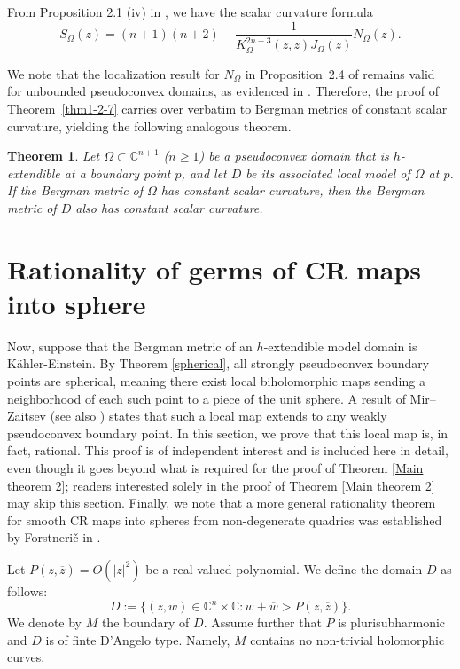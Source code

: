 \documentclass[a4paper,centertags,oneside,12pt]{amsart}
\newtheorem{theorem}{Theorem}[section]
\numberwithin{equation}{section}
\begin{document}
From Proposition 2.1 (iv) in \cite{KYu96}, we have the scalar curvature formula
\[
S_{\Omega}(z)=(n+1)(n+2)-\frac{1}{K_{\Omega}^{2n+3}(z, z)J_{\Omega}(z)}N_{\Omega}(z).
\]

We note that the localization result for \(N_{\Omega}\) in Proposition~2.4 of \cite{KYu96} remains valid for unbounded pseudoconvex domains, as evidenced in \cite{HJL25}. Therefore, the proof of Theorem~\ref{thm1-2-7} carries over verbatim to Bergman metrics of constant scalar curvature, yielding the following analogous theorem.


\renewcommand{\thetheorem}{3.3'}
\begin{theorem}\label{thm1-2-7-CSC}
    Let $\Omega\subset\mathbb C^{n+1}$ ($n\geq 1$) be a pseudoconvex domain that is $h$-extendible at a boundary point $p$, and let $D$ be its associated local model of $\Omega$ at $p$. If the Bergman metric of $\Omega$ has constant scalar curvature, then the Bergman metric of $D$ also has constant scalar curvature.
\end{theorem}
\renewcommand{\thetheorem}{\arabic{section}.\arabic{theorem}}
\section{Rationality  of germs of CR maps  into sphere}


Now, suppose that the Bergman metric of an $h$-extendible model domain is Kähler-Einstein. By Theorem \ref{spherical}, all strongly pseudoconvex boundary points are spherical, meaning there exist local biholomorphic maps sending a neighborhood of each such point to a piece of the unit sphere. A result of Mir–Zaitsev \cite{MZ21} (see also \cite{MMZ03, LMR23}) states that such a local map extends to any weakly pseudoconvex boundary point. In this section, we prove that this local map is, in fact, rational. This proof is of independent interest and is included here in detail, even though it goes beyond what is required for the proof of Theorem \ref{Main theorem 2}; readers interested solely in the proof of Theorem \ref{Main theorem 2} may skip this section. Finally, we note that a more general rationality theorem for smooth CR maps into spheres from non-degenerate quadrics was established by Forstnerič in \cite{Fo89, Fo92}.



Let $P(z,\overline{z})=O(|z|^2)$ be a real valued  polynomial. We  define the domain $D$ as follows:
$$D:=\{(z, w)\in\mathbb C^{n}\times\mathbb C: w+\overline w>P(z, \overline z)\}.$$
We denote by $M$ the boundary of $D$. Assume further that $P$ is plurisubharmonic and $D$ is of finte D'Angelo type. Namely, $M$ contains no non-trivial holomorphic curves.
\end{document}
